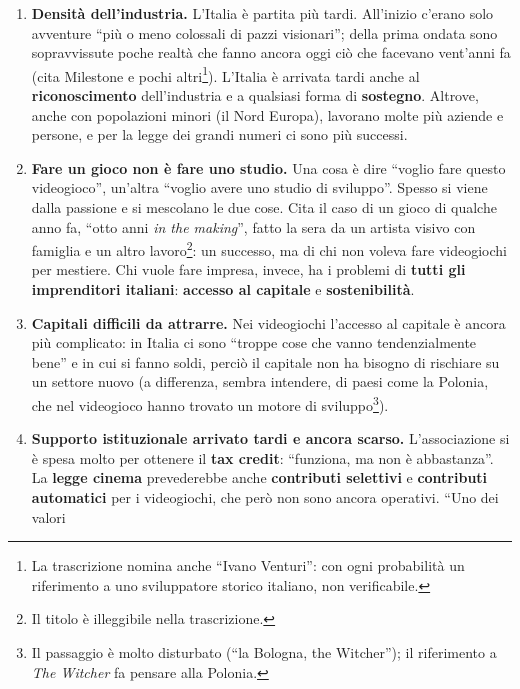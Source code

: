 \begin{enumerate}
  \item \textbf{Densità dell'industria.} L'Italia è partita più tardi. All'inizio
        c'erano solo avventure ``più o meno colossali di pazzi visionari''; della
        prima ondata sono sopravvissute poche realtà che fanno ancora oggi ciò che
        facevano vent'anni fa (cita Milestone e pochi altri\footnote{La
        trascrizione nomina anche ``Ivano Venturi'': con ogni probabilità un
        riferimento a uno sviluppatore storico italiano, non verificabile.}).
        L'Italia è arrivata tardi anche al \textbf{riconoscimento} dell'industria e
        a qualsiasi forma di \textbf{sostegno}. Altrove, anche con popolazioni
        minori (il Nord Europa), lavorano molte più aziende e persone, e per la
        legge dei grandi numeri ci sono più successi.
  \item \textbf{Fare un gioco non è fare uno studio.} Una cosa è dire ``voglio fare
        questo videogioco'', un'altra ``voglio avere uno studio di sviluppo''.
        Spesso si viene dalla passione e si mescolano le due cose. Cita il caso di
        un gioco di qualche anno fa, ``otto anni \emph{in the making}'', fatto la
        sera da un artista visivo con famiglia e un altro lavoro\footnote{Il titolo
        è illeggibile nella trascrizione.}: un successo, ma di chi non voleva fare
        videogiochi per mestiere. Chi vuole fare impresa, invece, ha i problemi di
        \textbf{tutti gli imprenditori italiani}: \textbf{accesso al capitale} e
        \textbf{sostenibilità}.
  \item \textbf{Capitali difficili da attrarre.} Nei videogiochi l'accesso al
        capitale è ancora più complicato: in Italia ci sono ``troppe cose che vanno
        tendenzialmente bene'' e in cui si fanno soldi, perciò il capitale non ha
        bisogno di rischiare su un settore nuovo (a differenza, sembra intendere,
        di paesi come la Polonia, che nel videogioco hanno trovato un motore di
        sviluppo\footnote{Il passaggio è molto disturbato (``la Bologna, the
        Witcher''); il riferimento a \emph{The Witcher} fa pensare alla Polonia.}).
  \item \textbf{Supporto istituzionale arrivato tardi e ancora scarso.}
        L'associazione si è spesa molto per ottenere il \textbf{tax credit}:
        ``funziona, ma non è abbastanza''. La \textbf{legge cinema} prevederebbe
        anche \textbf{contributi selettivi} e \textbf{contributi automatici} per i
        videogiochi, che però non sono ancora operativi. ``Uno dei valori

\end{enumerate}
